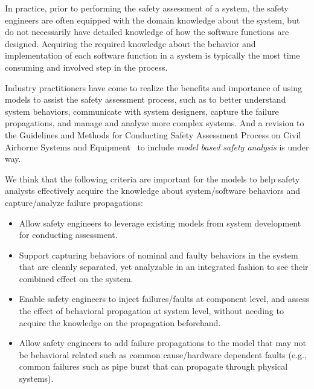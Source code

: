 In practice, prior to performing the safety assessment of a system, the safety engineers are often equipped with the domain knowledge about the system, but do not necessarily have detailed knowledge of how the software functions are designed. Acquiring the required knowledge about the behavior and implementation of each software function in a system is typically the most time consuming and involved step in the process.

Industry practitioners have come to realize the benefits and importance of
using models to assist the safety assessment process, such as to better understand system behaviors, communicate with system designers, capture the failure propagations, and manage and analyze more complex systems. And a revision to the Guidelines and Methods for Conducting Safety Assessment Process on Civil Airborne Systems and Equipment~\cite{SAE:ARP4761} to include {\em model based safety analysis} is under way.


We think that the following criteria are important for the models to help safety analysts effectively acquire the knowledge about system/software behaviors and capture/analyze failure propagations:

\begin{itemize}
	\item Allow safety engineers to leverage existing models from system development for conducting assessment. %
	\item Support capturing behaviors of nominal and faulty behaviors in the system that are cleanly separated, yet analyzable in an integrated fashion to see their combined effect on the system.
	\item Enable safety engineers to inject failures/faults at component level, and assess the effect of behavioral propagation at system level, without needing to acquire the knowledge on the propagation beforehand. 
	\item Allow safety engineers to add failure propagations to the model that may not be behavioral related such as common cause/hardware dependent faults (e.g., common failures such as pipe burst that can propagate through physical systems).
\end{itemize}

